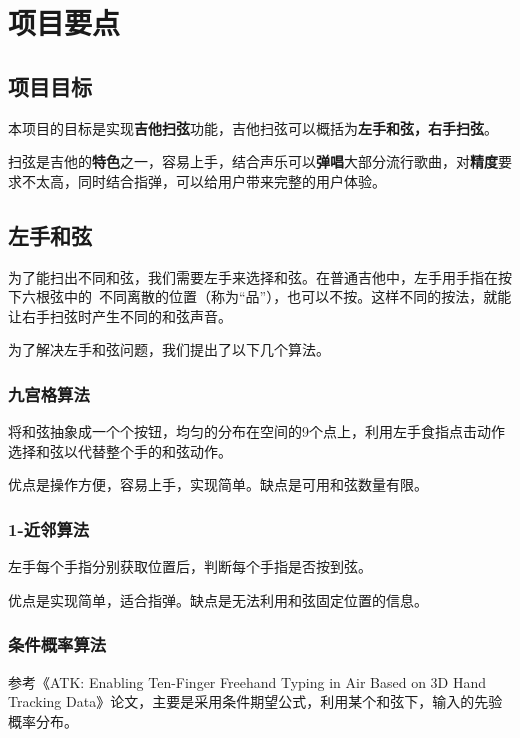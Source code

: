 \chapter{项目要点}

    \section{项目目标}

        本项目的目标是实现\textbf{吉他扫弦}功能，吉他扫弦可以概括为\textbf{左手和弦，右手扫弦}。

        扫弦是吉他的\textbf{特色}之一，容易上手，结合声乐可以\textbf{弹唱}大部分流行歌曲，对\textbf{精度}要求不太高，同时结合指弹，可以给用户带来完整的用户体验。
        
    \section{左手和弦}

        为了能扫出不同和弦，我们需要左手来选择和弦。在普通吉他中，左手用手指在按下六根弦中的\
        不同离散的位置（称为“品”），也可以不按。这样不同的按法，就能让右手扫弦时产生不同的和弦声音。


        为了解决左手和弦问题，我们提出了以下几个算法。

        \subsection{九宫格算法}

        将和弦抽象成一个个按钮，均匀的分布在空间的9个点上，利用左手食指点击动作选择和弦以代替整个手的和弦动作。

        优点是操作方便，容易上手，实现简单。缺点是可用和弦数量有限。

        \subsection{1-近邻算法}

        左手每个手指分别获取位置后，判断每个手指是否按到弦。

        优点是实现简单，适合指弹。缺点是无法利用和弦固定位置的信息。

        \subsection{条件概率算法}

        参考《ATK: Enabling Ten-Finger Freehand Typing in Air Based on 3D Hand Tracking Data》论文，主要是采用条件期望公式，利用某个和弦下，输入的先验概率分布。

